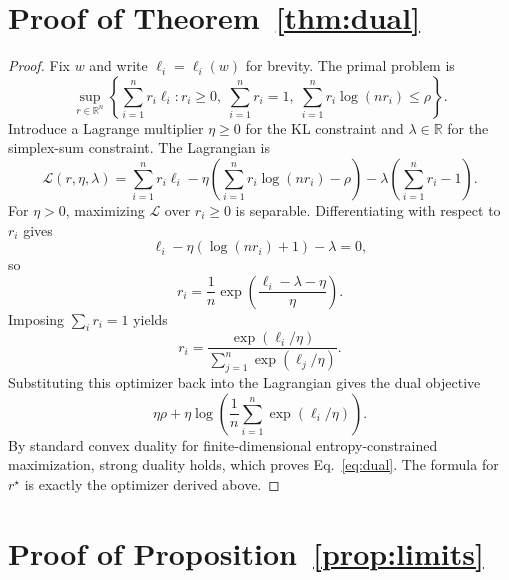 \documentclass{article}
\newcommand{\RR}{\mathbb{R}}
\begin{document}
\section{Proof of Theorem~\ref{thm:dual}}

\begin{proof}
Fix $w$ and write $\ell_i=\ell_i(w)$ for brevity. The primal problem is
\[
    \sup_{r\in\RR^n}
    \left\{
        \sum_{i=1}^{n} r_i\ell_i
        :
        r_i\ge 0,\;
        \sum_{i=1}^{n} r_i = 1,\;
        \sum_{i=1}^{n} r_i \log(n r_i)\le \rho
    \right\}.
\]
Introduce a Lagrange multiplier $\eta\ge 0$ for the KL constraint and $\lambda\in\RR$ for the simplex-sum constraint. The Lagrangian is
\[
    \mathcal L(r,\eta,\lambda)
    =
    \sum_{i=1}^{n} r_i\ell_i
    -
    \eta\left(\sum_{i=1}^{n} r_i\log(n r_i)-\rho\right)
    -
    \lambda\left(\sum_{i=1}^{n} r_i-1\right).
\]
For $\eta>0$, maximizing $\mathcal L$ over $r_i\ge 0$ is separable. Differentiating with respect to $r_i$ gives
\[
    \ell_i - \eta(\log(nr_i)+1) - \lambda = 0,
\]
so
\[
    r_i
    =
    \frac{1}{n}\exp\!\left(\frac{\ell_i-\lambda-\eta}{\eta}\right).
\]
Imposing $\sum_i r_i=1$ yields
\[
    r_i
    =
    \frac{\exp(\ell_i/\eta)}{\sum_{j=1}^{n}\exp(\ell_j/\eta)}.
\]
Substituting this optimizer back into the Lagrangian gives the dual objective
\[
    \eta \rho + \eta \log\!\left(\frac{1}{n}\sum_{i=1}^{n}\exp(\ell_i/\eta)\right).
\]
By standard convex duality for finite-dimensional entropy-constrained maximization, strong duality holds, which proves Eq.~\eqref{eq:dual}. The formula for $r^{\star}$ is exactly the optimizer derived above.
\end{proof}

\section{Proof of Proposition~\ref{prop:limits}}
\end{document}
